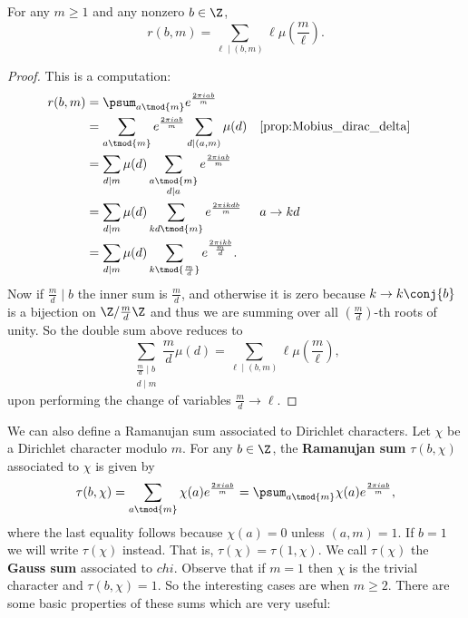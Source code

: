       \begin{proposition}\label{prop:Ramanujan_sum_evaluation}
        For any $m \ge 1$ and any nonzero $b \in \Z$,
        \[
          r(b,m) = \sum_{\ell \mid (b,m)}\ell\mu\left(\frac{m}{\ell}\right).
        \]
      \end{proposition}
      \begin{proof}
        This is a computation:
        \begin{align*}
          r(b,m) &= \psum_{a \tmod{m}}e^{\frac{2\pi iab}{m}} \\
          &= \sum_{a \tmod{m}}e^{\frac{2\pi iab}{m}}\sum_{d \mid (a,m)}\mu(d) && \text{\cref{prop:Mobius_dirac_delta}} \\
          &= \sum_{d \mid m}\mu(d)\sum_{\substack{a \tmod{m} \\ d \mid a}}e^{\frac{2\pi iab}{m}} \\
          &= \sum_{d \mid m}\mu(d)\sum_{kd \tmod{m}}e^{\frac{2\pi ikdb}{m}} && \text{$a \to kd$} \\
          &= \sum_{d \mid m}\mu(d)\sum_{k \tmod{\frac{m}{d}}}e^{\frac{2\pi ik b}{\frac{m}{d}}}.
        \end{align*}
        Now if $\frac{m}{d} \mid b$ the inner sum is $\frac{m}{d}$, and otherwise it is zero because $k \to k\conj{b}$ is a bijection on $\Z/\frac{m}{d}\Z$ and thus we are summing over all $\left(\frac{m}{d}\right)$-th roots of unity. So the double sum above reduces to
        \[
          \sum_{\substack{\frac{m}{d} \mid b \\ d \mid m}}\frac{m}{d}\mu(d) = \sum_{\ell \mid (b,m)}\ell\mu\left(\frac{m}{\ell}\right),
        \]
        upon performing the change of variables $\frac{m}{d} \to \ell$.
      \end{proof}
      We can also define a Ramanujan sum associated to Dirichlet characters. Let $\chi$ be a Dirichlet character modulo $m$. For any $b \in \Z$, the \textbf{Ramanujan sum} $\tau(b,\chi)$ associated to $\chi$ is given by
      \[
        \tau(b,\chi) = \sum_{a \tmod{m}}\chi(a)e^{\frac{2\pi iab}{m}} = \psum_{a \tmod{m}}\chi(a)e^{\frac{2\pi iab}{m}},
      \]
      where the last equality follows because $\chi(a) = 0$ unless $(a,m) = 1$. If $b = 1$ we will write $\tau(\chi)$ instead. That is, $\tau(\chi) = \tau(1,\chi)$. We call $\tau(\chi)$ the \textbf{Gauss sum} associated to $chi$. Observe that if $m = 1$ then $\chi$ is the trivial character and $\tau(b,\chi) = 1$. So the interesting cases are when $m \ge 2$. There are some basic properties of these sums which are very useful:

